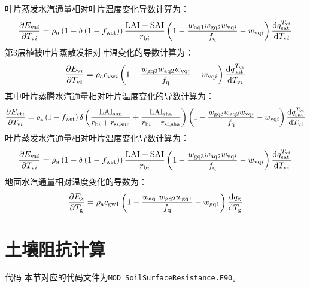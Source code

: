 %
叶片蒸发水汽通量相对叶片温度变化导数计算为：
\begin{equation}
  \frac{\partial E_{\mathrm{va}i}}{\partial T_{\mathrm{v}i}} = \rho_{\mathrm{a}}\left( 1 - \delta\left( 1 - f_{\mathrm{wet}} \right) \right)\frac{\text{LAI} + \text{SAI}}{r_{\mathrm{b}i}}\left( 1 - \frac{w_{\mathrm{aq1}}w_{\mathrm{gq2}}w_{\mathrm{vq}i}}{f_{\mathrm{q}}} - w_{\mathrm{vq}i} \right)\frac{{\rm d}q_{\mathrm{sat}}^{T_{\mathrm{v}i}}}{{\rm d}T_{\mathrm{v}i}}
\end{equation}
%
第3层植被叶片蒸散发相对叶温变化的导数计算为：
\begin{equation}
  \frac{\partial E_{\mathrm{v}i}}{\partial T_{\mathrm{v}i}} = \rho_{\mathrm{a}}c_{\mathrm{vw}i}\left( 1 - \frac{w_{\mathrm{gq3}}w_{\mathrm{aq2}}w_{\mathrm{vq}i}}{f_{\mathrm{q}}} - w_{\mathrm{vq}i} \right)\frac{{\rm d}q_{\mathrm{sat}}^{T_{\mathrm{v}i}}}{{\rm d}T_{\mathrm{v}i}}
\end{equation}
%
其中叶片蒸腾水汽通量相对叶片温度变化的导数计算为：
\begin{equation}
  \frac{\partial E_{\mathrm{vt}i}}{\partial T_{\mathrm{v}i}} = \rho_{\mathrm{a}}\left( 1 - f_{\mathrm{wet}} \right)\delta\left( \frac{\text{LAI}_{\mathrm{sun}}}{r_{\mathrm{b}i} + r_{\mathrm{s}i,\mathrm {sun}}} + \frac{\text{LAI}_{\mathrm{sha}}}{r_{\mathrm{b}i} + r_{\mathrm{s}i,\mathrm {sha}}} \right)\left( 1 - \frac{w_{\mathrm{gq3}}w_{\mathrm{aq2}}w_{\mathrm{vq}i}}{f_{\mathrm{q}}} - w_{\mathrm{vq}i} \right)\frac{{\rm d}q_{\mathrm{sat}}^{T_{\mathrm{v}i}}}{{\rm d}T_{\mathrm{v}i}}
\end{equation}
%
叶片蒸发水汽通量相对叶片温度变化导数计算为：
\begin{equation}
  \frac{\partial E_{\mathrm{va}i}}{\partial T_{\mathrm{v}i}} = \rho_{\mathrm{a}}\left( 1 - \delta\left( 1 - f_{\mathrm{wet}} \right) \right)\frac{\text{LAI} + \text{SAI}}{r_{\mathrm{b}i}}\left( 1 - \frac{w_{\mathrm{gq3}}w_{\mathrm{aq2}}w_{\mathrm{vq}i}}{f_{\mathrm{q}}} - w_{\mathrm{vq}i} \right)\frac{{\rm d}q_{\mathrm{sat}}^{T_{\mathrm{v}i}}}{{\rm d}T_{\mathrm{v}i}}
\end{equation}
%
地面水汽通量相对温度变化的导数为：
\begin{equation}
  \frac{\partial E_{\mathrm{g}}}{\partial T_{\mathrm{g}}} = \rho_{\mathrm{a}}c_{\mathrm{gw1}}\left( 1 - \frac{w_{\mathrm{aq1}}w_{\mathrm{gq2}}w_{\mathrm{gq1}}}{f_{\mathrm {q}}} -w_{\mathrm{gq1}} \right)\frac{{\rm d}q_{\mathrm{g}}}{{\rm d}T_{\mathrm{g}}}
\end{equation}

\section{土壤阻抗计算}
\begin{mymdframed}{代码}
  本节对应的代码文件为\texttt{MOD\_SoilSurfaceResistance.F90}。
\end{mymdframed}

